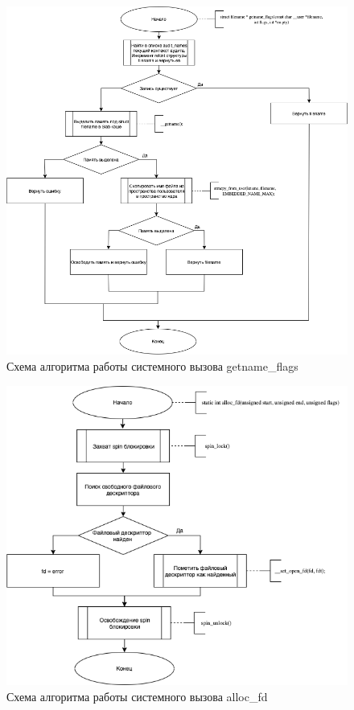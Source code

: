 \documentclass[12pt]{report}
\begin{document}
\begin{figure}[h!]
            \centering
            \includegraphics[scale=0.65]{getname_flags.png}
            \caption{Схема алгоритма работы системного вызова getname\_flags}
            \label{png:testing:result}
\end{figure}

\begin{figure}[h!]
            \centering
            \includegraphics[scale=0.7]{alloc_fd.png}
            \caption{Схема алгоритма работы системного вызова alloc\_fd}
            \label{png:testing:result}
\end{figure}
\end{document}

